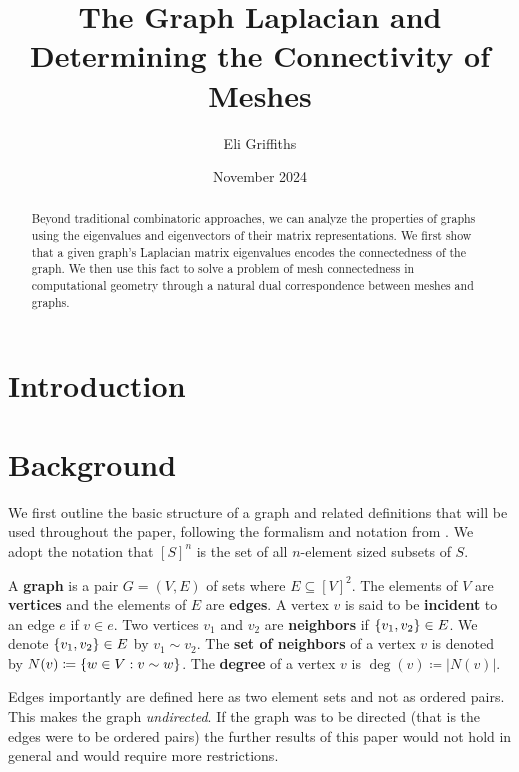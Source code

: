 \documentclass[12pt]{article}
\title{The Graph Laplacian and Determining the Connectivity of Meshes}
\author{Eli Griffiths}
\date{November 2024}
\begin{document}
\maketitle

\begin{abstract}
    Beyond traditional combinatoric approaches, we can analyze the properties of graphs using the eigenvalues and eigenvectors of their matrix representations. We first show that a given graph’s Laplacian matrix eigenvalues encodes the connectedness of the graph. We then use this fact to solve a problem of mesh connectedness in computational geometry through a natural dual correspondence between meshes and graphs.   
\end{abstract}

\section{Introduction}

\section{Background}

We first outline the basic structure of a graph and related definitions that will be used throughout the paper, following the formalism and notation from \cite{diestelGraphTheory2017}. We adopt the notation that $[S]^n$ is the set of all $n$-element sized subsets of $S$.

\begin{definition}
    A \textbf{graph} is a pair $G = (V, E)$ of sets where $E \subseteq [V]^2$. The elements of $V$ are \textbf{vertices} and the elements of $E$ are \textbf{edges}. A vertex $v$ is said to be \textbf{incident} to an edge $e$ if $v \in e$. Two vertices $v_1$ and $v_2$ are \textbf{neighbors} if $\qty{v_1, v_2} \in E$. We denote $\qty{v_1, v_2} \in E$ by $v_1 \sim v_2$. The \textbf{set of neighbors} of a vertex $v$ is denoted by $N(v) \coloneq \qty{w \in V : v \sim w}$. The \textbf{degree} of a vertex $v$ is $\deg(v) \coloneq |N(v)|$.
\end{definition}

\begin{remark}
    Edges importantly are defined here as two element sets and not as ordered pairs. This makes the graph \textit{undirected}. If the graph was to be directed (that is the edges were to be ordered pairs) the further results of this paper would not hold in general and would require more restrictions.
\end{remark}
\end{document}
